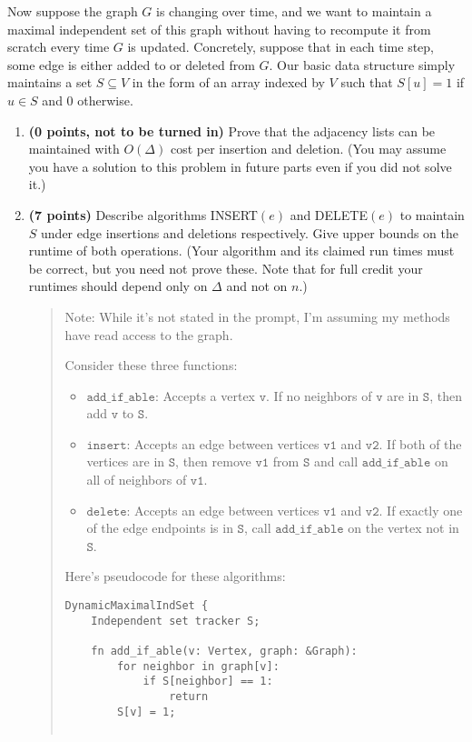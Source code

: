 \documentclass[11pt]{article}
\newcommand{\code}[1]{$\texttt{#1}$}
\begin{document}
\begin{enumerate}
Now suppose the graph $G$ is changing over time, and we want to maintain a maximal independent set of this graph without having to recompute it from scratch every time $G$ is updated. Concretely, suppose that in each time step, some edge is either added to or deleted from $G$. Our basic data structure simply maintains a set $S \subseteq V$ in the form of an array indexed by $V$ such that $S[u]=1$ if $u \in S$ and $0$ otherwise.

\begin{enumerate}[resume]
    \item {\bf (0 points, not to be turned in)} Prove that the adjacency lists can be maintained with $O(\Delta)$ cost per insertion and deletion. (You may assume you have a solution to this problem in future parts even if you did not solve it.)
    \item {\bf (7 points)} Describe algorithms INSERT$(e)$ and DELETE$(e)$ to maintain $S$ under edge insertions and deletions respectively. Give upper bounds on the runtime of both operations. \label{part:2c} (Your algorithm and its claimed run times must be correct, but you need not prove these. Note that for full credit your runtimes should depend only on $\Delta$ and not on $n$.)
    \begin{quote}
      \color{purple}
      Note: While it's not stated in the prompt, I'm assuming my methods have read access to the graph. 

      \medskip 
      Consider these three functions:
      \begin{itemize}
        \item \code{add\_if\_able}: Accepts a vertex \code{v}. If no neighbors of \code{v} are in \code{S}, then add \code{v} to \code{S}.
        \item \code{insert}: Accepts an edge between vertices \code{v1} and \code{v2}. If both of the vertices are in \code{S}, then remove \code{v1} from \code{S} and call \code{add\_if\_able} on all of neighbors of \code{v1}.
        \item \code{delete}: Accepts an edge between vertices \code{v1} and \code{v2}. If exactly one of the edge endpoints is in \code{S}, call \code{add\_if\_able} on the vertex not in \code{S}.
      \end{itemize}
      Here's pseudocode for these algorithms:
      \newpage
\begin{verbatim}
DynamicMaximalIndSet {
    Independent set tracker S;

    fn add_if_able(v: Vertex, graph: &Graph):
        for neighbor in graph[v]:
            if S[neighbor] == 1:
                return
        S[v] = 1;


\end{verbatim}
\end{quote}
\end{enumerate}
\end{enumerate}
\end{document}

